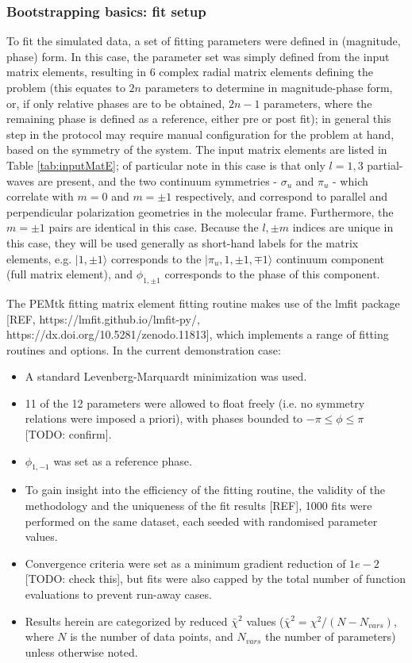 \subsubsection{Bootstrapping basics: fit setup}

To fit the simulated data, a set of fitting parameters were defined in (magnitude, phase) form. In this case, the parameter set was simply defined from the input matrix elements, resulting in 6 complex radial matrix elements defining the problem (this equates to $2n$ parameters to determine in magnitude-phase form, or, if only relative phases are to be obtained, $2n-1$ parameters, where the remaining phase is defined as a reference, either pre or post fit); in general this step in the protocol may require manual configuration for the problem at hand, based on the symmetry of the system. The input matrix elements are listed in Table \ref{tab:inputMatE}; of particular note in this case is that only $l=1,3$ partial-waves are present, and the two continuum symmetries - $\sigma_u$ and $\pi_u$ - which correlate with $m=0$ and $m=\pm1$ respectively, and correspond to parallel and perpendicular polarization geometries in the molecular frame. Furthermore, the $m=\pm1$ pairs are identical in this case. Because the $l,\pm m$ indices are unique in this case, they will be used generally as short-hand labels for the matrix elements, e.g. $|1,\pm1\rangle$ corresponds to the $|\pi_u,1,\pm 1,\mp 1 \rangle$ continuum component (full matrix element), and $\phi_{1,\pm1}$ corresponds to the phase of this component.

The PEMtk fitting matrix element fitting routine makes use of the lmfit package [REF, https://lmfit.github.io/lmfit-py/, https://dx.doi.org/10.5281/zenodo.11813], which implements a range of fitting routines and options. In the current demonstration case:

\begin{itemize}
\item A standard Levenberg-Marquardt minimization was used.
\item 11 of the 12 parameters were allowed to float freely (i.e. no symmetry relations were imposed a priori), with phases bounded to $-\pi\leq\phi\leq\pi$ [TODO: confirm].
\item $\phi_{1,-1}$ was set as a reference phase. 
\item To gain insight into the efficiency of the fitting routine, the validity of the methodology and the uniqueness of the fit results [REF], 1000 fits were performed on the same dataset, each seeded with randomised parameter values. 
\item Convergence criteria were set as a minimum gradient reduction of $1e-2$ [TODO: check this], but fits were also capped by the total number of function evaluations to prevent run-away cases.
\item Results herein are categorized by reduced $\bar{\chi}^2$ values ($\bar{\chi}^2=\chi^2/(N-N_{vars})$, where $N$ is the number of data points, and $N_{vars}$ the number of parameters) unless otherwise noted.
\end{itemize}

